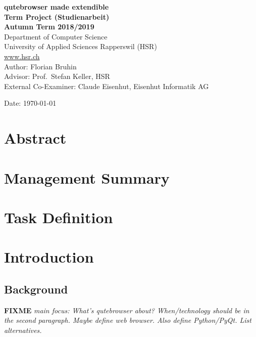 \documentclass[a4paper,parskip=full]{scrreprt}
\newcommand{\fixme}[1]{\textbf{FIXME} \emph{#1}}
\begin{document}
\begin{titlepage}
\begin{flushleft}
{\huge \bfseries qutebrowser made extendible}\\[0.5cm]
{\large \bfseries Term Project (Studienarbeit) \\[0.2cm] Autumn Term 2018/2019}\\[2cm]

Department of Computer Science\\
University of Applied Sciences Rapperswil (HSR)\\
\url{www.hsr.ch}\\[1cm]

Author: Florian Bruhin\\[0.3cm]
Advisor: Prof.~Stefan Keller, HSR\\[0.3cm]
External Co-Examiner: Claude Eisenhut, Eisenhut Informatik AG

\vfill
Date: {\today}

\end{flushleft}

\end{titlepage}



\chapter*{Abstract}

\chapter*{Management Summary}


\tableofcontents
\listoffigures
\listoftables


\chapter*{Task Definition}

\chapter{Introduction}

\section{Background}

\fixme{main focus: What's qutebrowser about? When/technology should be in the
  second paragraph. Maybe define web browser. Also define Python/PyQt. List
alternatives.}
\end{document}

